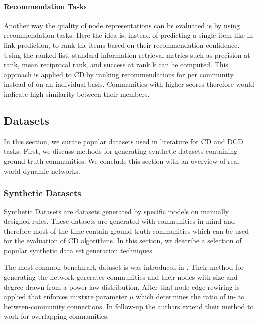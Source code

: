 \documentclass[
acmsmall,
nonacm,
screen,
acmthm]{acmart}
\begin{document}
\hypertarget{recommendation-tasks}{%
\paragraph{Recommendation Tasks}\label{recommendation-tasks}}

Another way the quality of node representations can be evaluated is by
using recommendation tasks. Here the idea is, instead of predicting a
single item like in link-prediction, to rank the items based on their
recommendation confidence. Using the ranked list, standard information
retrieval metrics such as precision at rank, mean reciprocal rank, and
success at rank k can be computed. This approach is applied to CD
\citep{rozemberczkiGEMSECGraphEmbedding2019, huangInformationFusionOriented2022, faniUserCommunityDetection2020}
by ranking recommendations for per community instead of on an individual
basis. Communities with higher scores therefore would indicate high
similarity between their members.

\hypertarget{datasets}{%
\subsection{Datasets}\label{datasets}}

In this section, we curate popular datasets used in literature for CD
and DCD tasks. First, we discuss methods for generating synthetic
datasets containing ground-truth communities. We conclude this section
with an overview of real-world dynamic networks.

\hypertarget{synthetic-datasets}{%
\subsubsection{Synthetic Datasets}\label{synthetic-datasets}}

Synthetic Datasets are datasets generated by specific models on manually
designed rules. These datasets are generated with communities in mind
and therefore most of the time contain ground-truth communities which
can be used for the evaluation of CD algorithms. In this section, we
describe a selection of popular synthetic data set generation
techniques.

The most common benchmark dataset is was introduced in
\citet{lancichinettiBenchmarkGraphsTesting2008}. Their method for
generating the network generates communities and their nodes with size
and degree drawn from a power-law distribution. After that node edge
rewiring is applied that enforces mixture parameter \(\mu\) which
determines the ratio of in- to between-community connections. In
follow-up \citep{lancichinettiBenchmarksTestingCommunity2009} the
authors extend their method to work for overlapping communities.
\end{document}
